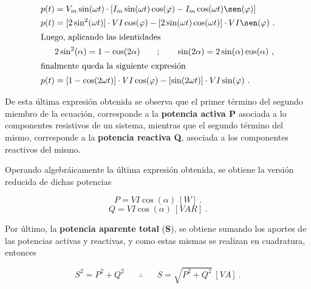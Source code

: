         \vspace{-15pt}
         \begin{align}
            p(t)  &= V_m \sin(\omega t)\cdot [I_m \sin(\omega t) \cos(\varphi) - I_m \cos(\omega t) \sen(\varphi)]  \notag \\
            p(t)   &= [2 \sin^{2}(\omega t)]\cdot V I \cos(\varphi) - [2 \sin(\omega t) \cos(\omega t)]\cdot V I\sen(\varphi) ~.\notag \\
            \intertext{Luego, aplicando las identidades}
                  &2 \sin^{2}(\alpha)  = 1 - \cos(2\alpha) \hspace{20pt} ; \hspace{20pt} \sin(2\alpha) = 2 \sin(\alpha) \cos(\alpha) \ , \notag \\
            \intertext{finalmente queda la siguiente expresión}
            p(t)  &= [1- \cos(2 \omega t)]\cdot V I \cos(\varphi) - [\sin(2 \omega t)]\cdot V I \sin(\varphi) ~. 
         \end{align}

      De esta última expresión obtenida se observa que el primer término del segundo miembro
      de la ecuación, corresponde a la \textbf{potencia activa P} asociada a lo componentes
      resistivos de un sistema, mientras que el segundo término del mismo, corresponde a la 
      \textbf{potencia reactiva Q}, asociada a los componentes reactivos del mismo.

      Operando algebráicamente la última expresión obtenida, se obtiene la versión reducida
      de dichas potencias   

        \begin{equation}
            \boxed{P   = V I \cos(\alpha)~[W]}~.  \label{eqn:PotActTot}
        \end{equation}
        \begin{equation}
            \boxed{Q   = V I \cos(\alpha)~[VAR]}~. \label{eqn:PotReacTot}
        \end{equation}

      Por último, la \textbf{potencia aparente total} (\textbf{S}), se obtiene  sumando los aportes de
      las potencias activas y reactivas, y como estas mismas se realizan en cuadratura, entonces

        \begin{equation}
            S^{2} = P^{2} + Q^{2} \hspace{20pt} \therefore \hspace{20pt} \boxed{S = \sqrt{P^{2} + Q^{2}}~[VA]} ~. \label{eqn:PotApaTot}       
         \end{equation}


